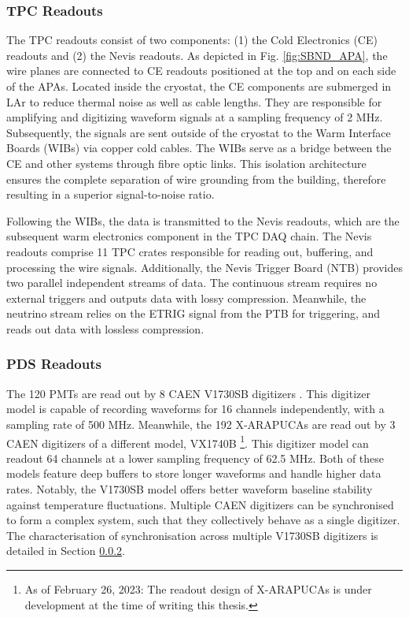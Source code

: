 \subsubsection{TPC Readouts}

The TPC readouts consist of two components: (1) the Cold Electronics (CE) readouts \cite{SBND_CE} and (2) the Nevis readouts. 
As depicted in Fig. \ref{fig:SBND_APA}, the wire planes are connected to CE readouts positioned at the top and on each side of the APAs.
Located inside the cryostat, the CE components are submerged in LAr to reduce thermal noise as well as cable lengths. 
They are responsible for amplifying and digitizing waveform signals at a sampling frequency of 2 MHz. 
Subsequently, the signals are sent outside of the cryostat to the Warm Interface Boards (WIBs) via copper cold cables. 
The WIBs serve as a bridge between the CE and other systems through fibre optic links.
This isolation architecture ensures the complete separation of wire grounding from the building, therefore resulting in a superior signal-to-noise ratio.

Following the WIBs, the data is transmitted to the Nevis readouts, which are the subsequent warm electronics component in the TPC DAQ chain.
The Nevis readouts comprise 11 TPC crates responsible for reading out, buffering, and processing the wire signals. 
Additionally, the Nevis Trigger Board (NTB) provides two parallel independent streams of data.
The continuous stream requires no external triggers and outputs data with lossy compression. 
Meanwhile, the neutrino stream relies on the ETRIG signal from the PTB for triggering, and reads out data with lossless compression.

\subsubsection{PDS Readouts}

The 120 PMTs are read out by 8 CAEN V1730SB digitizers \cite{caen1730}. 
This digitizer model is capable of recording waveforms for 16 channels independently, with a sampling rate of 500 MHz.
Meanwhile, the 192 X-ARAPUCAs are read out by 3 CAEN digitizers of a different model, VX1740B \cite{caen1740} \footnote{As of February 26, 2023: The readout design of X-ARAPUCAs is under development at the time of writing this thesis.}.
This digitizer model can readout 64 channels at a lower sampling frequency of 62.5 MHz. 
Both of these models feature deep buffers to store longer waveforms and handle higher data rates.
Notably, the V1730SB model offers better waveform baseline stability against temperature fluctuations. 
Multiple CAEN digitizers can be synchronised to form a complex system, such that they collectively behave as a single digitizer. 
The characterisation of synchronisation across multiple V1730SB digitizers is detailed in Section \ref{}.

